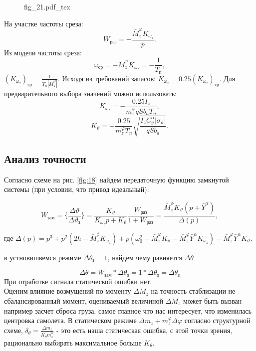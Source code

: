 \documentclass{article}
\begin{document}
\begin{figure}[H]
	\centering
	{fig_21.pdf_tex}
\end{figure}

На участке частоты среза:
\[
	W_\text{раз} = -\frac{\bar{M}_z^\varphi K_{\omega_z}}{p}.
\]
Из модели частоты среза:
\[
	\omega_\text{ср} = -\bar{M}_z^\varphi K_{\omega_z} = -\frac{1}{T_\text{п}},
\]
$(K_{\omega_z})_\text{гр} = \frac{1}{T_n |\bar{M}_z^\varphi|}.$
Исходя из требований запасов:
$K_{\omega_z} = 0.25 (K_{\omega_z})_\text{гр}.$
Для предварительного выбора значений можно использовать:
\[
	K_{\omega_z} = - \frac{0.25 I_z}{{m}_z^\varphi q S b_a T_n},
\]
\[
	K_{\vartheta} = - \frac{0.25}{{m}_z^\varphi T_n} \sqrt{\frac{I_z C_y^\alpha |\sigma_\vartheta|}{q S b_a}}.
\]

\subsection{Анализ точности}
Согласно схеме на рис. \ref{fig:18} найдем передаточную функцию замкнутой системы (при условии, что привод идеальный):

\begin{equation}
	W_\text{зам}= \{\frac{\Delta \vartheta}{\Delta \vartheta_\text{з}}\} =\frac{K_{\vartheta}}{K_{\omega_z}p +K_{\vartheta}}\frac{W_\text{раз}}{1 + W_\text{раз}} =\frac{\bar{M}_z^\phi K_{\vartheta}(p + \bar{Y}^\alpha)}{\Delta(p)},  
	\label{eq:w_zam_1}
\end{equation}

где $\Delta(p) = p^3 + p^2(2h - \bar{M}_z^\phi K_{\omega_z}) + p(\omega_0^2 -\bar{M}_z^\varphi K_\vartheta - \bar{M}_z^\varphi \bar{Y}^\alpha K_{\omega_z}) -\bar{M}_z^\varphi \bar{Y}^\alpha K_{\vartheta} $.

в устновишвемся режиме $\Delta \theta_\text{з} = 1$, найдем чему равняется $\Delta \theta$

\[
	\Delta \theta = W_\text{зам} * \Delta \theta_\text{з} = 1* \Delta \theta_\text{з} = \Delta \theta_\text{з}
\]
При отработке сигнала статической ошибки нет. \\
Оценим влияние возмущений по моменту $\Delta M_z$ на точность стаблизации не сбалансированный момент, оцениваемый величиной $\Delta M_z$ может быть вызван например засчет сброса груза, самое главное что нас интересует, что изменилась центровка самолета. В статическом режиме $\Delta m_z + m_z^\varphi \Delta \varphi$ согласно структурной схеме, $\delta_\theta =\frac{\Delta m_z}{K_\theta m_z^\phi}$ - это есть наша статическая ошибка, с этой точки зрения, рационально выбирать максимальное больше $K_\theta$.
\end{document}
